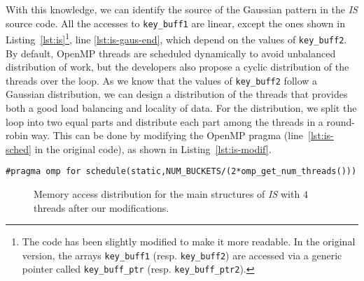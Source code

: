With this knowledge, we can identify the source of the
Gaussian pattern in the \emph{IS} source code. All the accesses to \texttt{key\_buff1} are linear,
except the ones shown in Listing~\ref{lst:is}\footnote{
    The code has been slightly modified to make it more readable. In the
    original version, the arrays \texttt{key\_buff1} (resp. \texttt{key\_buff2})
    are accessed via a generic pointer called \texttt{key\_buff\_ptr} (resp.
    \texttt{key\_buff\_ptr2}).
}, line \ref{lst:is-gaus-end}, which depend on the values of
\texttt{key\_buff2}.
By default, OpenMP threads are scheduled dynamically to avoid unbalanced
distribution of work, but the developers also propose a cyclic distribution
of the threads over the loop. As we know that the values of \texttt{key\_buff2}
follow a Gaussian distribution, we can design a distribution of the threads that
provides both a good load balancing and locality of data. For the distribution, we split
the loop into two equal parts and distribute each part among the threads in a round-robin way. This can be done by modifying the OpenMP pragma (line~\ref{lst:is-sched} in the original code), as shown
in Listing~\ref{lst:is-modif}.

\begin{lstlisting}[float=!h,caption=Optimization for \emph{IS}., label=lst:is-modif]
#pragma omp for schedule(static,NUM_BUCKETS/(2*omp_get_num_threads()))
\end{lstlisting}

\begin{figure}[!p]
    \centering


    \vspace{-3mm}


    \vspace{-3mm}

    \vspace{-3mm}
    \caption{Memory access distribution for the main structures of
        \emph{IS} with $4$ threads after our modifications.}
    \label{fig:is-behaviour-modif}
\end{figure}


